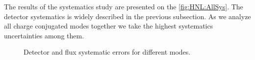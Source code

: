 \documentclass[../main.tex]{subfiles}
\begin{document}
The results of the systematics study are presented on the \autoref{fig:HNL:AllSys}. The detector systematics is widely described in the previous subsection. As we analyze all charge conjugated modes together we take the highest systematics uncertainties among them.

\begin{figure}[!ht]
    \begin{center}
    \begin{minipage}{0.49\linewidth}
    \end{minipage}
    \hfill
    \begin{minipage}{0.49\linewidth}
    \end{minipage}
    \vfill
    \begin{minipage}{0.49\linewidth}
    \end{minipage}
    \caption{Detector and flux systematic errors for different modes.}
    \label{fig:HNL:AllSys}
        \end{center}
\end{figure}
\end{document}
